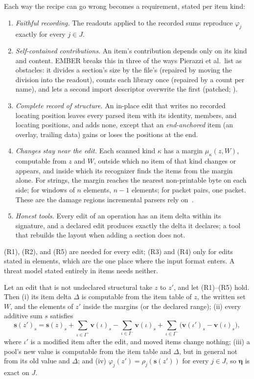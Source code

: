 Each way the recipe can go wrong becomes a requirement, stated per item kind:
\begin{enumerate}[label=(R\arabic*),leftmargin=*,itemsep=1pt]
  \item \emph{Faithful recording.} The readouts applied to the recorded sums reproduce $\varphi_j$ exactly for every
    $j \in J$.
  \item \emph{Self-contained contributions.} An item's contribution depends only on its kind and content. EMBER
    breaks this in three of the ways Pierazzi et al.\ list as obstacles: it divides a section's size by the file's
    (repaired by moving the division into the readout), counts each library once (repaired by a count per name), and
    lets a second import descriptor overwrite the first (patched; ).
  \item \emph{Complete record of structure.} An in-place edit that writes no recorded locating position leaves every
    parsed item with its identity, members, and locating positions, and adds none, except that an \emph{end-anchored}
    item (an overlay, trailing data) gains or loses the positions at the end.
  \item \emph{Changes stay near the edit.} Each scanned kind $\kappa$ has a margin $\mu_\kappa(z, W)$, computable from
    $z$ and $W$, outside which no item of that kind changes or appears, and inside which its recognizer finds the
    items from the margin alone. For strings, the margin reaches the nearest non-printable byte on each side; for
    windows of $n$ elements, $n-1$ elements; for packet pairs, one packet. These are the damage regions incremental
    parsers rely on~\cite{wagner1998efficient}.
  \item \emph{Honest tools.} Every edit of an operation has an item delta within its signature, and a declared edit
    produces exactly the delta it declares; a tool that rebuilds the layout when adding a section does not.
\end{enumerate}
(R1), (R2), and (R5) are needed for every edit; (R3) and (R4) only for edits stated in elements, which are the one
place where the input format enters. A threat model stated entirely in items needs neither.

\label{thm:fw:side-effects}
{
Let an edit that is not undeclared structural take $z$ to $z'$, and let (R1)--(R5) hold. Then
(i) its item delta $\Delta$ is computable from the item table of $z$, the written set $W$, and the elements of $z'$
inside the margins (or the declared range);
(ii) every additive sum $s$ satisfies
\[
  \mathbf{s}(z')_s = \mathbf{s}(z)_s + \sum_{\iota \in I^+} \mathbf{v}(\iota)_s - \sum_{\iota \in I^-}
  \mathbf{v}(\iota)_s + \sum_{\iota \in I^\sim} \big(\mathbf{v}(\iota')_s - \mathbf{v}(\iota)_s\big),
\]
where $\iota'$ is a modified item after the edit, and moved items change nothing;
(iii) a pool's new value is computable from the item table and $\Delta$, but in general not from its old value and
$\Delta$; and (iv) $\varphi_j(z') = \rho_j(\mathbf{s}(z'))$ for every $j \in J$, so $\boldsymbol{\eta}$ is exact on
$J$.
}

